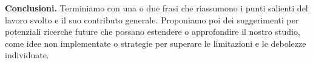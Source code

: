 \medskip

\textbf{Conclusioni.} Terminiamo con una o due frasi che riassumono i punti salienti del lavoro svolto e il suo contributo generale. Proponiamo poi dei suggerimenti per potenziali ricerche future che possano estendere o approfondire il nostro studio, come idee non implementate o strategie per superare le limitazioni e le debolezze individuate.








